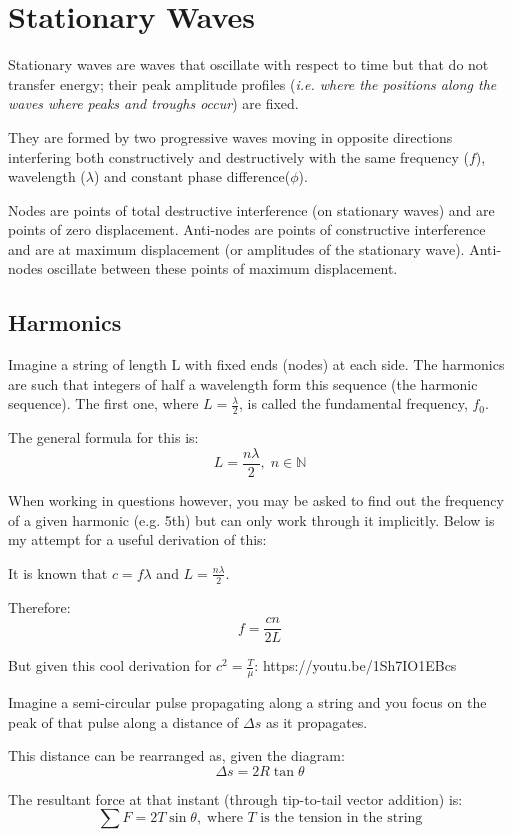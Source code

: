 \documentclass{article}
\begin{document}
\section{Stationary Waves}
Stationary waves are waves that oscillate with respect to time but that do not transfer energy; their peak amplitude profiles (\textit{i.e. where the positions along the waves where peaks and troughs occur}) are fixed.

They are formed by two progressive waves moving in opposite directions interfering both constructively and destructively with the same frequency ($f$), wavelength ($\lambda$) and constant phase difference($\phi$). 

Nodes are points of total destructive interference (on stationary waves) and are points of zero displacement. Anti-nodes are points of constructive interference and are at maximum displacement (or amplitudes of the stationary wave). Anti-nodes oscillate between these points of maximum displacement.

\subsection{Harmonics}
Imagine a string of length L with fixed ends (nodes) at each side. The harmonics are such that integers of half a wavelength form this sequence (the harmonic sequence). The first one, where $L = \frac{\lambda}{2}$, is called the fundamental frequency, $f_0$.

The general formula for this is: 
$$L = \frac{n\lambda}{2}, \; n \in \mathbb{N}$$

When working in questions however, you may be asked to find out the frequency of a given harmonic (e.g. 5th) but can only work through it implicitly. Below is my attempt for a useful derivation of this:

It is known that $c = f\lambda$ and $L = \frac{n\lambda}{2}$. 

Therefore:
$$f = \frac{cn}{2L}$$

But given this cool derivation for $c^2 = \frac{T}{\mu}$:
https://youtu.be/1Sh7IO1EBcs

Imagine a semi-circular pulse propagating along a string and you focus on the peak of that pulse along a distance of $\Delta s$ as it propagates. 

This distance can be rearranged as, given the diagram: 
$$\Delta s = 2R\tan{\theta}$$

The resultant force at that instant (through tip-to-tail vector addition) is: 
$$\sum{F} = 2T\sin{\theta}, \; \text{where $T$ is the tension in the string}$$
\end{document}
